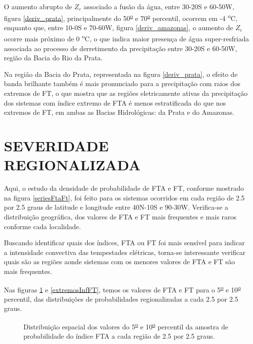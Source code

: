 O aumento abrupto de $Z_c$ associado a fusão da água, entre 30-20S e 60-50W, figura \ref{deriv_prata}, principalmente do 50\textsuperscript{\underline{o}} e 70\textsuperscript{\underline{o}} percentil, ocorrem em -4 \textsuperscript{o}C, enquanto que, entre 10-0S e 70-60W, figura \ref{deriv_amazonas}, o aumento de $Z_c$ ocorre mais próximo de 0 \textsuperscript{o}C, o que indica maior presença de água super-resfriada associada ao processo de derretimento da precipitação entre 30-20S e 60-50W, região da Bacia do Rio da Prata.  

Na região da Bacia do Prata, representada na figura \ref{deriv_prata}, o efeito de banda brilhante também é mais pronunciado para a precipitação com raios dos extremos de FT, o que mostra que as regiões eletricamente ativas da precipitação dos sistemas com índice extremo de FTA é menos estratificada do que nos extremos de FT, em ambas as Bacias Hidrológicas: da Prata e do Amazonas.

\newpage
\section{SEVERIDADE REGIONALIZADA}

Aqui, o estudo da densidade de probabilidade de FTA e FT, conforme mostrado na figura \ref{seriesFtaFt}, foi feito para os sistemas ocorridos em cada região de 2.5 por 2.5 graus de latitude e longitude entre 40N-10S e 90-30W. Verifica-se a distribuição geográfica, dos valores de FTA e FT mais frequentes e mais raros conforme cada localidade.

Buscando identificar quais dos índices, FTA ou FT foi mais sensível para indicar a intensidade convectiva das tempestades elétricas, torna-se interessante verificar quais são as regiões aonde sistemas com os menores valores de FTA e FT são mais frequentes.

Nas figuras \ref{extremosInfFTA} e \ref{extremosInfFT}, temos os valores de FTA e FT  para o 5\textsuperscript{\underline{o}} e 10\textsuperscript{\underline{o}} percentil, das distribuições de probabilidades regionalizadas a cada 2.5 por 2.5 graus.

\begin{figure}[!ht]
  \caption{Distribuição espacial dos valores do 5\textsuperscript{\underline{o}} e 10\textsuperscript{\underline{o}} percentil da amostra de probabilidade do índice FTA a cada região de 2.5 por 2.5 graus.}
\label{extremosInfFTA}
\end{figure} 

